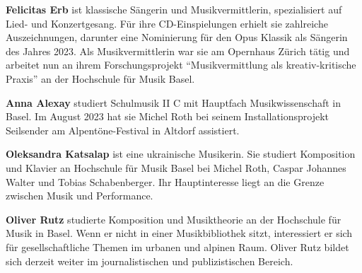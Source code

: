 \documentclass[a4paper,
fontsize=11pt,
oneside,
numbers=noperiodatend,
parskip=half-,
bibliography=totoc,
final
]{scrartcl}
\begin{document}
\textbf{Felicitas Erb} ist klassische Sängerin und Musikvermittlerin,
spezialisiert auf Lied- und Konzertgesang. Für ihre CD-Einspielungen
erhielt sie zahlreiche Auszeichnungen, darunter eine Nominierung für den
Opus Klassik als Sängerin des Jahres 2023. Als Musikvermittlerin war sie
am Opernhaus Zürich tätig und arbeitet nun an ihrem Forschungsprojekt
\enquote{Musikvermittlung als kreativ-kritische Praxis} an der Hochschule für
Musik Basel.

\textbf{Anna Alexay} studiert Schulmusik II C mit Hauptfach
Musikwissenschaft in Basel. Im August 2023 hat sie Michel Roth bei
seinem Installationsprojekt Seilsender am Alpentöne-Festival in Altdorf
assistiert.

\textbf{Oleksandra Katsalap} ist eine ukrainische Musikerin. Sie
studiert Komposition und Klavier an Hochschule für Musik Basel bei
Michel Roth, Caspar Johannes Walter und Tobias Schabenberger. Ihr
Hauptinteresse liegt an die Grenze zwischen Musik und Performance.

\textbf{Oliver Rutz} studierte Komposition und Musiktheorie an der
Hochschule für Musik in Basel. Wenn er nicht in einer Musikbibliothek
sitzt, interessiert er sich für gesellschaftliche Themen im urbanen und
alpinen Raum. Oliver Rutz bildet sich derzeit weiter im journalistischen
und publizistischen Bereich.
\end{document}
